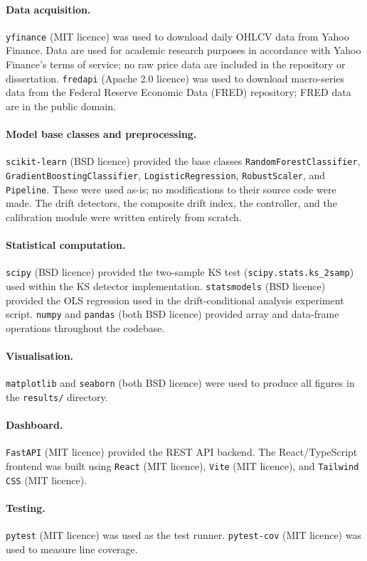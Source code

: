 \begin{appendices}
\paragraph{Data acquisition.}
\texttt{yfinance} (MIT licence) was used to download daily OHLCV data from Yahoo
Finance.  Data are used for academic research purposes in accordance with Yahoo
Finance's terms of service; no raw price data are included in the repository or
dissertation.  \texttt{fredapi} (Apache 2.0 licence) was used to download
macro-series data from the Federal Reserve Economic Data (FRED) repository; FRED
data are in the public domain.

\paragraph{Model base classes and preprocessing.}
\texttt{scikit-learn} (BSD licence) provided the base classes
\texttt{RandomForestClassifier}, \texttt{GradientBoostingClassifier},
\texttt{LogisticRegression}, \texttt{RobustScaler}, and \texttt{Pipeline}.
These were used as-is; no modifications to their source code were made.  The
drift detectors, the composite drift index, the controller, and the calibration
module were written entirely from scratch.

\paragraph{Statistical computation.}
\texttt{scipy} (BSD licence) provided the two-sample KS test
(\texttt{scipy.stats.ks\_2samp}) used within the KS detector implementation.
\texttt{statsmodels} (BSD licence) provided the OLS regression used in the
drift-conditional analysis experiment script.  \texttt{numpy} and \texttt{pandas}
(both BSD licence) provided array and data-frame operations throughout the codebase.

\paragraph{Visualisation.}
\texttt{matplotlib} and \texttt{seaborn} (both BSD licence) were used to produce
all figures in the \texttt{results/} directory.

\paragraph{Dashboard.}
\texttt{FastAPI} (MIT licence) provided the REST API backend.  The React/TypeScript
frontend was built using \texttt{React} (MIT licence), \texttt{Vite} (MIT licence),
and \texttt{Tailwind CSS} (MIT licence).

\paragraph{Testing.}
\texttt{pytest} (MIT licence) was used as the test runner.
\texttt{pytest-cov} (MIT licence) was used to measure line coverage.

\end{appendices}